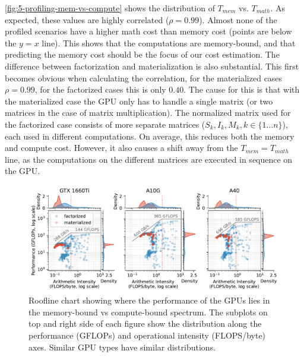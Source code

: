 \autoref{fig:5-profiling-mem-vs-compute} shows the distribution of $T_{mem}$ vs. $T_{math}$. As expected, these values are highly correlated ($\rho = 0.99$). Almost none of the profiled scenarios have a higher math cost than memory cost (points are below the $y=x$ line). This shows that the computations are memory-bound, and that predicting the memory cost should be the focus of our cost estimation. The difference between factorization and materialization is also substantial. This first becomes obvious when calculating the correlation, for the materialized cases $\rho = 0.99$, for the factorized cases this is only $0.40$. The cause for this is that with the materialized case the GPU only has to handle a single matrix (or two matrices in the case of matrix multiplication). The normalized matrix used for the factorized case consists of more separate matrices ($S_k,I_k,M_k, k \in \{1 \ldots n\}$), each used in different computations. On average, this reduces both the memory and compute cost. However, it also causes a shift away from the $T_{mem} = T_{math}$ line, as the computations on the different matrices are executed in sequence on the GPU.

\begin{figure}
    \centering
    \includegraphics[width=\linewidth]{chapters/05_cost_estimation/figures/roofline-plot.pdf}
    \caption[Roofline chart comparing F/M, per GPU]{Roofline chart showing where the performance of the GPUs lies in the memory-bound vs compute-bound spectrum. The subplots on top and right side of each figure show the distribution along the performance (GFLOPs) and operational intensity (FLOPS/byte) axes. Similar GPU types have similar distributions.}
    \label{fig:5-roofline-plot}
\end{figure}

